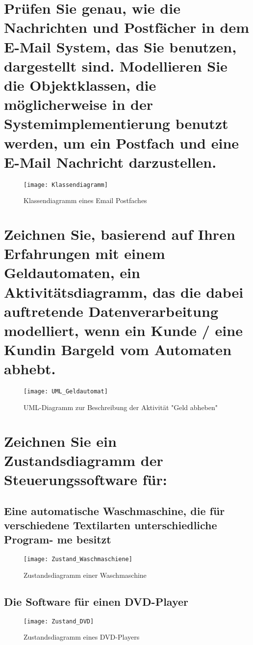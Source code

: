 \documentclass[12pt]{article}
\begin{document}
\section{Prüfen Sie genau, wie die Nachrichten und Postfächer in dem E-Mail System, das Sie benutzen, dargestellt sind. Modellieren Sie die Objektklassen, die möglicherweise in der Systemimplementierung benutzt
werden, um ein Postfach und eine E-Mail Nachricht darzustellen.}
\begin{figure}[h]
\begin{center}
\texttt{[image: Klassendiagramm]}
\caption{Klassendiagramm eines Email Postfaches}
\end{center}
\end{figure}
\pagebreak
\section{Zeichnen Sie, basierend auf Ihren Erfahrungen mit einem Geldautomaten, ein Aktivitätsdiagramm, das die
dabei auftretende Datenverarbeitung modelliert, wenn ein Kunde / eine Kundin Bargeld vom Automaten
abhebt.}
\begin{figure}[h]
\begin{center}
\texttt{[image: UML\_Geldautomat]}
\caption{UML-Diagramm zur Beschreibung der Aktivität "Geld abheben"}
\end{center}
\end{figure}
\pagebreak
\section{Zeichnen Sie ein Zustandsdiagramm der Steuerungssoftware für:}
\subsection{Eine automatische Waschmaschine, die für verschiedene Textilarten unterschiedliche Program-
me besitzt}
\begin{figure}[h]
\begin{center}
\texttt{[image: Zustand\_Waschmaschiene]}
\caption{Zustandsdiagramm einer Waschmaschine}
\end{center}
\end{figure}
\pagebreak
\subsection{Die Software für einen DVD-Player}
\begin{figure}[h]
\begin{center}
\texttt{[image: Zustand\_DVD]}
\caption{Zustandsdiagramm eines DVD-Players}
\end{center}
\end{figure}
\printbibliography
\end{document}
